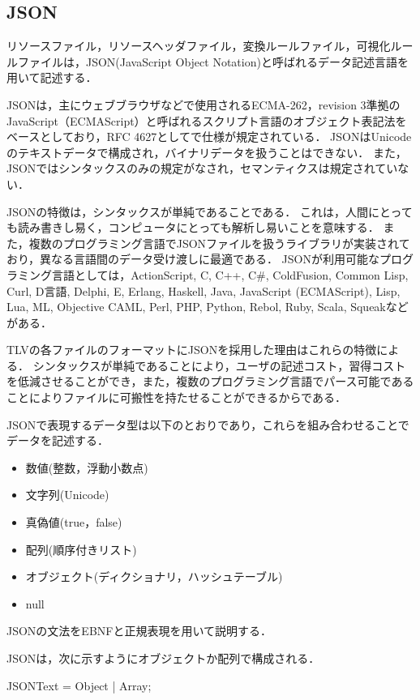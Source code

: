 \subsection{JSON}

リソースファイル，リソースヘッダファイル，変換ルールファイル，可視化ルールファイルは，JSON(JavaScript Object Notation)\cite{JSON}と呼ばれるデータ記述言語を用いて記述する．

JSONは，主にウェブブラウザなどで使用されるECMA-262，revision 3準拠のJavaScript（ECMAScript）と呼ばれるスクリプト言語のオブジェクト表記法をベースとしており，RFC 4627としてで仕様が規定されている．
JSONはUnicodeのテキストデータで構成され，バイナリデータを扱うことはできない．
また，JSONではシンタックスのみの規定がなされ，セマンティクスは規定されていない．

JSONの特徴は，シンタックスが単純であることである．
これは，人間にとっても読み書きし易く，コンピュータにとっても解析し易いことを意味する．
また，複数のプログラミング言語でJSONファイルを扱うライブラリが実装されており，異なる言語間のデータ受け渡しに最適である．
JSONが利用可能なプログラミング言語としては，ActionScript, C, C++, C\#, ColdFusion, Common Lisp, Curl, D言語, Delphi, E, Erlang, Haskell, Java, JavaScript (ECMAScript), Lisp, Lua, ML, Objective CAML, Perl, PHP, Python, Rebol, Ruby, Scala, Squeakなどがある．

TLVの各ファイルのフォーマットにJSONを採用した理由はこれらの特徴による．
シンタックスが単純であることにより，ユーザの記述コスト，習得コストを低減させることができ，また，複数のプログラミング言語でパース可能であることによりファイルに可搬性を持たせることができるからである．

JSONで表現するデータ型は以下のとおりであり，これらを組み合わせることでデータを記述する．
\begin{itemize}
\setlength{\itemsep}{0.5\itemsep}
\item 数値(整数，浮動小数点)
\item 文字列(Unicode)
\item 真偽値(true，false)
\item 配列(順序付きリスト)
\item オブジェクト(ディクショナリ，ハッシュテーブル)
\item null
\end{itemize}

JSONの文法をEBNFと正規表現を用いて説明する．

JSONは，次に示すようにオブジェクトか配列で構成される．

\begin{EBNF}
JSONText = Object | Array;
\end{EBNF}

